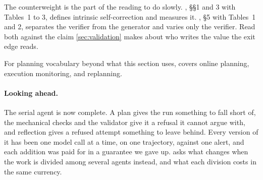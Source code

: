 The counterweight is the part of the reading to do slowly. \citet{huang2024selfcorrect}, \S\S1 and 3
with Tables~1 to 3, defines intrinsic self-correction and measures it. \citet{stechly2025selfverification},
\S5 with Tables~1 and 2, separates the verifier from the generator and varies only the verifier.
Read both against the claim \cref{sec:validation} makes about who writes the value the exit edge
reads.

For planning vocabulary beyond what this section uses, \citet[\S11.5.3]{russell2020aima} covers
online planning, execution monitoring, and replanning.

\paragraph{Looking ahead.}
The serial agent is now complete. A plan gives the run something to fall short of, the mechanical
checks and the validator give it a refusal it cannot argue with, and reflection gives a refused
attempt something to leave behind. Every version of it has been one model call at a time, on one
trajectory, against one alert, and each addition was paid for in a guarantee we gave up.
 asks what changes when the work is divided among several agents instead, and
what each division costs in the same currency.
